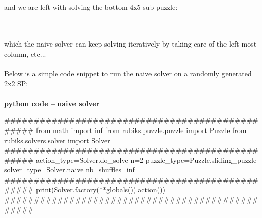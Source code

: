 \\
\begin{twentyfour}
\end{twentyfour}
%
\begin{twentyfour}
\end{twentyfour}
%
\begin{twentyfour}
\end{twentyfour}
\\
\begin{twentyfour}
\end{twentyfour}
%
\begin{twentyfour}
\end{twentyfour}
%
\begin{twentyfour}
\end{twentyfour}
\\
\\
and we are left with solving the bottom 4x5 sub-puzzle:
\\
\begin{twenty}
\end{twenty}
\\
\\
which the naive solver can keep solving iteratively by taking care of the left-most column, etc...
\\
\\
Below is a simple code snippet to run the naive solver on a randomly generated 2x2 SP:
\afblue
\paragraph{}{\textbf{python code -- naive solver}}
\begin{python}
################################################
from math import inf
from rubiks.puzzle.puzzle import Puzzle
from rubiks.solvers.solver import Solver
################################################
action_type=Solver.do_solve
n=2
puzzle_type=Puzzle.sliding_puzzle
solver_type=Solver.naive
nb_shuffles=inf
################################################
print(Solver.factory(**globals()).action())
################################################
\end{python}
\black




